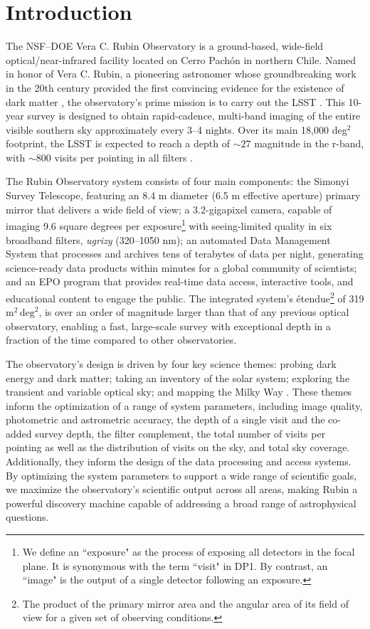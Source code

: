 \section{Introduction}
\label{sec:intro}
The \gls{NSF}–\gls{DOE} Vera C. Rubin Observatory is a ground-based, wide-field optical/near-infrared facility located on Cerro Pach\'on in northern Chile.
Named in honor of Vera C. Rubin, a pioneering astronomer whose groundbreaking work in the 20th century provided the first convincing evidence for the existence of dark matter \citep{1970ApJ...159..379R, 1980ApJ...238..471R}, the observatory’s prime mission is to carry out the \gls{LSST} \citep{2019ApJ...873..111I}.
This 10-year survey is designed to obtain rapid-cadence, multi-band imaging of the entire visible southern sky approximately every 3–4 nights. 
Over its main 18,000 deg$^2$ footprint, the LSST is expected to reach a depth of $\sim27$ magnitude in the r-band, with $\sim$800 visits per pointing in all filters \citep{2022ApJS..258....1B}.

The Rubin Observatory system consists of four main components: the \gls{Simonyi Survey Telescope}, featuring an 8.4 m diameter (6.5 m effective aperture) primary mirror that delivers a wide field of view; a 3.2-gigapixel camera, capable of imaging 9.6 square degrees per exposure\footnote{We define an ``exposure" as the process of exposing all  detectors in the focal plane. It is synonymous with the term ``visit" in DP1. By contrast, an ``image" is the output of a single detector following an exposure.} with seeing-limited quality in six broadband filters, \textit{ugrizy} (320–1050 nm); an automated \gls{Data Management System} that processes and archives tens of terabytes of data per night, generating science-ready data products within minutes for a global community of scientists; and an \gls{EPO} program that provides real-time data access, interactive tools, and educational content to engage the public.
The integrated system's \'etendue\footnote{The product of the primary mirror area and the angular area of its field of view for a given set of observing conditions.} of 319 $\text{m}^2 \,\text{deg}^2$, is over an order of magnitude larger than that of any previous optical observatory, enabling a fast, large-scale survey with exceptional depth in a fraction of the time compared to other observatories.

The observatory's design is driven by four key science themes: probing dark energy and dark matter; taking an inventory of the solar system; exploring the transient and variable optical sky; and mapping the Milky Way \citep{2019ApJ...873..111I}.
These themes inform the optimization of a range of system parameters, including image quality, photometric and astrometric accuracy, the depth of a single visit and the co-added survey depth, the filter complement, the total number of visits per pointing as well as the distribution of visits on the sky, and  total sky coverage.
Additionally, they inform the design of the data processing and access systems.
By optimizing the system parameters to support a wide range of scientific goals, we maximize the observatory's scientific output across all areas, making Rubin a powerful discovery machine capable of addressing a broad range of astrophysical questions.

